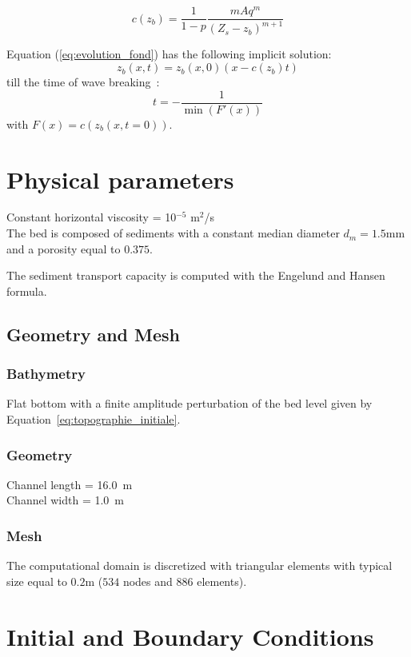 \begin{equation}
c (z_b)=\frac{1}{1-p}\frac{m A q^m}{ (Z_s-z_b)^{m+1}}
\end{equation}

Equation (\ref{eq:evolution_fond}) has the following implicit solution:
\begin{equation}
z_b(x,t)=z_b(x,0)(x-c(z_b)t)
\end{equation}
till the time of wave breaking~\cite{Kubatko2008}:
\begin{equation}
t=-\frac{1}{\min (F' (x))}
\end{equation}
with $F(x)=c (z_b (x,t=0))$.

\section{Physical parameters}
%
Constant horizontal viscosity =  10$^{-5}$ m$^2$/s\\

The bed is composed of sediments with a constant median diameter $d_m=1.5$mm and a porosity equal to $0.375$.

The sediment transport capacity is computed with the Engelund and Hansen formula.
%
\subsection{Geometry and Mesh}
%
\subsubsection{Bathymetry}
%
Flat bottom with a finite amplitude perturbation of the bed level given by Equation~\ref{eq:topographie_initiale}.

\subsubsection{Geometry}
%
Channel length = 16.0~m\\
Channel width = 1.0~m

\subsubsection{Mesh}
%
The computational domain is discretized with triangular elements with typical size equal to $0.2$m ($534$ nodes and $886$ elements).

\section{Initial and Boundary Conditions}

